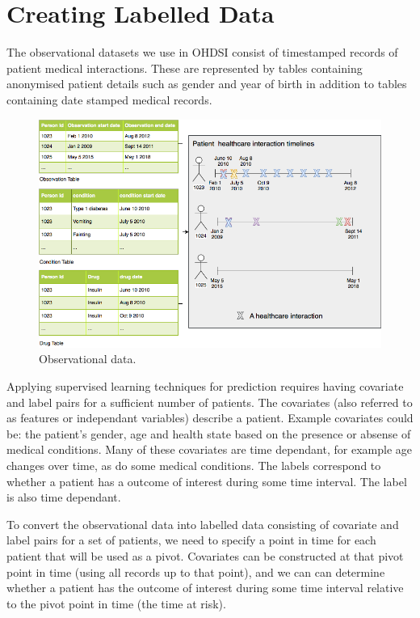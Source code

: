 \documentclass[11pt]{book}
\theoremstyle{definition}
\theoremstyle{definition}
\theoremstyle{definition}
\theoremstyle{remark}
\begin{document}
\hypertarget{extracted}{%
\section{Creating Labelled Data}\label{extracted}}

The observational datasets we use in OHDSI consist of timestamped records of patient medical interactions. These are represented by tables containing anonymised patient details such as gender and year of birth in addition to tables containing date stamped medical records.

\begin{figure}
\includegraphics[width=1\linewidth]{images/PatientLevelPrediction/theory/patienttimeline} \caption{Observational data.}\label{fig:figuretheory1}
\end{figure}

Applying supervised learning techniques for prediction requires having covariate and label pairs for a sufficient number of patients. The covariates (also referred to as features or independant variables) describe a patient. Example covariates could be: the patient's gender, age and health state based on the presence or absense of medical conditions. Many of these covariates are time dependant, for example age changes over time, as do some medical conditions. The labels correspond to whether a patient has a outcome of interest during some time interval. The label is also time dependant.

To convert the observational data into labelled data consisting of covariate and label pairs for a set of patients, we need to specify a point in time for each patient that will be used as a pivot. Covariates can be constructed at that pivot point in time (using all records up to that point), and we can can determine whether a patient has the outcome of interest during some time interval relative to the pivot point in time (the time at risk).
\end{document}
